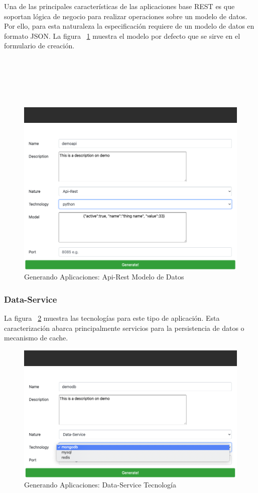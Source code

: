 \documentclass[a4paper,11pt]{book}
\begin{document}
Una de las principales características de las aplicaciones base REST es que soportan lógica de negocio para realizar operaciones sobre un modelo de datos. Por ello, para esta naturaleza la especificación requiere de un modelo de datos en formato JSON. La figura ~\ref{19} muestra el modelo por defecto que se sirve en el formulario de creación. 
~\\
~\\
~\\
~\\
~\\
~\\
\begin{figure}[H]
\centering
\includegraphics[scale=0.45]{imagenes/casouso_a/19.png}
\caption{  Generando Aplicaciones: Api-Rest Modelo de Datos  }
\label{19}
\end{figure}

\newpage
\subsubsection{Data-Service}

La figura ~\ref{20} muestra las tecnologías para este tipo de aplicación. Esta caracterización abarca principalmente servicios para la persistencia de datos o mecanismo de cache.



\begin{figure}[H]
\centering
\includegraphics[scale=0.5]{imagenes/casouso_a/20.png}
\caption{  Generando Aplicaciones: Data-Service Tecnología  }
\label{20}
\end{figure}
\end{document}

